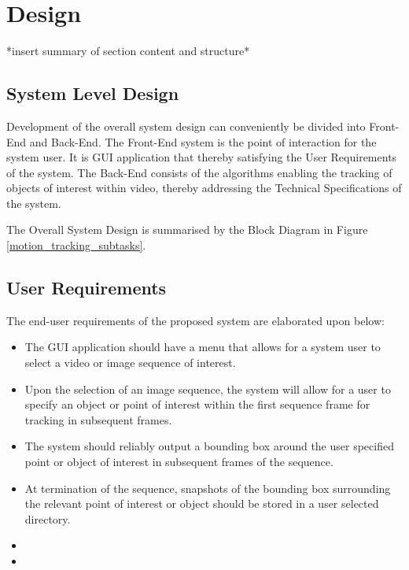 \chapter{Design}\label{chapter_design}
*insert summary of section content and structure*

\section{System Level Design}
Development of the overall system design can conveniently be divided into
Front-End and Back-End. The Front-End system is the point of interaction for the
system user. It is GUI application that thereby satisfying the User Requirements
of the system. The Back-End consists of the algorithms enabling the tracking of
objects of interest within video, thereby addressing the Technical
Specifications of the system.

The Overall System Design is summarised by the Block Diagram in Figure
\ref{motion_tracking_subtasks}.


\section{User Requirements}
The end-user requirements of the proposed system are elaborated upon below:
\begin{itemize}
    \item The GUI application should have a menu that allows for a system
        user to select a video or image sequence of interest.
    \item Upon the selection of an image sequence, the system will allow for a
        user to specify an object or point of interest within the first sequence
        frame for tracking in subsequent frames.
    \item The system should reliably output a bounding box around the user
        specified point or object of interest in subsequent frames of the
        sequence. 
    \item At termination of the sequence, snapshots of the bounding box
        surrounding the relevant point of interest or object should be stored in
        a user selected directory.
    \item
    \item 
\end{itemize}

